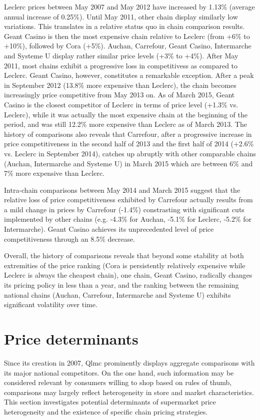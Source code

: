 \documentclass[english]{article}
\begin{document}
Leclerc prices between May 2007 and May 2012 have increased by 1.13\% (average annual increase of 0.25\%). Until May 2011, other chain display similarly low variations. This translates in a relative status quo in chain comparison results. Geant Casino is then the most expensive chain relative to Leclerc (from +6\% to +10\%), followed by Cora (+5\%). Auchan, Carrefour, Geant Casino, Intermarche and Systeme U display rather similar price levels (+3\% to +4\%). After May 2011, most chains exhibit a progressive loss in competitivess as compared to Leclerc. Geant Casino, however, constitutes a remarkable exception. After a peak in September 2012 (13.8\% more expensive than Leclerc), the chain becomes increasingly price competitive from May 2013 on. As of March 2015, Geant Casino is the closest competitor of Leclerc in terms of price level (+1.3\% vs. Leclerc), while it was actually the most expensive chain at the beginning of the period, and was still 12.2\% more expensive than Leclerc as of March 2013. The history of comparisons also reveals that Carrefour, after a progressive increase in price competitiveness in the second half of 2013 and the first half of 2014 (+2.6\% vs. Leclerc in September 2014), catches up abruptly with other comparable chains (Auchan, Intermarche and Systeme U) in March 2015 which are between 6\% and 7\% more expensive than Leclerc.

Intra-chain comparisons between May 2014 and March 2015 suggest that the relative loss of price competitiveness exhibited by Carrefour actually results from a mild change in prices by Carrefour (-1.4\%) constrasting with significant cuts implemented by other chains (e.g. -4.3\% for Auchan, -5.1\% for Leclerc, -5.2\% for Intermarche). Geant Casino achieves its unprecedented level of price competitiveness through an 8.5\% decrease.

Overall, the history of comparisons reveals that beyond some stability at both extremities of the price ranking (Cora is persistently relatively expensive while Leclerc is always the cheapest chain), one chain, Geant Casino, radically changes its pricing policy in less than a year, and the ranking between the remaining national chains (Auchan, Carrefour, Intermarche and Systeme U) exhibits significant volatility over time.

\section{Price determinants}

Since its creation in 2007, Qlmc prominently displays aggregate comparisons with its major national competitors. On the one hand, such information may be considered relevant by consumers willing to shop based on rules of thumb, comparisons may largely reflect heterogeneity in store and market characteristics. This section investigates potential determinants of supermarket price heterogeneity and the existence of specific chain pricing strategies.
\end{document}
